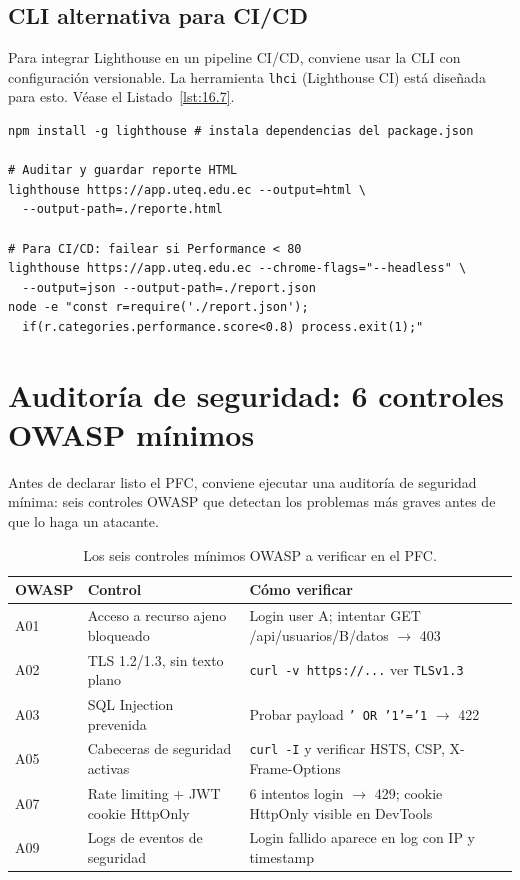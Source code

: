 \subsection{CLI alternativa para CI/CD}

Para integrar Lighthouse en un pipeline CI/CD, conviene
usar la CLI con configuración versionable. La herramienta \texttt{lhci}
(Lighthouse CI) está diseñada para esto. V\'ease el Listado~\ref{lst:16.7}.


\begin{lstlisting}[style=shell,numbers=none,caption={Ejemplo de Shell},label=lst:16.7]
npm install -g lighthouse # instala dependencias del package.json

# Auditar y guardar reporte HTML
lighthouse https://app.uteq.edu.ec --output=html \
  --output-path=./reporte.html

# Para CI/CD: failear si Performance < 80
lighthouse https://app.uteq.edu.ec --chrome-flags="--headless" \
  --output=json --output-path=./report.json
node -e "const r=require('./report.json');
  if(r.categories.performance.score<0.8) process.exit(1);"
\end{lstlisting}

\section{Auditoría de seguridad: 6 controles OWASP mínimos}

Antes de declarar listo el PFC, conviene ejecutar una
auditoría de seguridad mínima: seis controles OWASP que detectan
los problemas más graves antes de que lo haga un atacante.


\begin{table}[htbp]
\centering
\caption{Los seis controles mínimos OWASP a verificar en el PFC.}
\footnotesize
\begin{tabularx}{\textwidth}{lXX}
\toprule
\textbf{OWASP} & \textbf{Control} & \textbf{Cómo verificar}\\
\midrule
A01 & Acceso a recurso ajeno bloqueado & Login user A; intentar GET /api/usuarios/B/datos $\to$ 403\\
A02 & TLS 1.2/1.3, sin texto plano & \texttt{curl -v https://...} ver \texttt{TLSv1.3}\\
A03 & SQL Injection prevenida & Probar payload \texttt{' OR '1'='1} $\to$ 422\\
A05 & Cabeceras de seguridad activas & \texttt{curl -I} y verificar HSTS, CSP, X-Frame-Options\\
A07 & Rate limiting + JWT cookie HttpOnly & 6 intentos login $\to$ 429; cookie HttpOnly visible en DevTools\\
A09 & Logs de eventos de seguridad & Login fallido aparece en log con IP y timestamp\\
\bottomrule
\end{tabularx}
\end{table}

